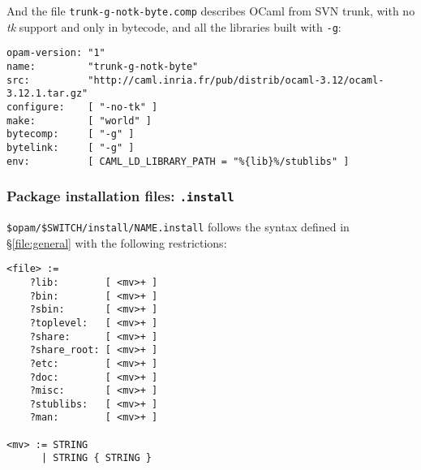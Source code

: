 \documentclass[a4paper,10pt]{article}
\begin{document}
And the file {\tt trunk-g-notk-byte.comp} describes OCaml from SVN
trunk, with no {\em tk} support and only in bytecode, and all the
libraries built with {\tt -g}:

\begin{verbatim}
opam-version: "1"
name:         "trunk-g-notk-byte"
src:          "http://caml.inria.fr/pub/distrib/ocaml-3.12/ocaml-3.12.1.tar.gz"
configure:    [ "-no-tk" ]
make:         [ "world" ]
bytecomp:     [ "-g" ]
bytelink:     [ "-g" ]
env:          [ CAML_LD_LIBRARY_PATH = "%{lib}%/stublibs" ]
\end{verbatim}


\subsubsection{Package installation files: {\tt *.install}}
\label{file:install}

\verb+$opam/$SWITCH/install/NAME.install+ follows the syntax defined
in \S\ref{file:general} with the following restrictions:

{\small
\begin{Verbatim}[frame=single]
<file> :=
    ?lib:        [ <mv>+ ]
    ?bin:        [ <mv>+ ]
    ?sbin:       [ <mv>+ ]
    ?toplevel:   [ <mv>+ ]
    ?share:      [ <mv>+ ]
    ?share_root: [ <mv>+ ]
    ?etc:        [ <mv>+ ]
    ?doc:        [ <mv>+ ]
    ?misc:       [ <mv>+ ]
    ?stublibs:   [ <mv>+ ]
    ?man:        [ <mv>+ ]

<mv> := STRING
      | STRING { STRING }
\end{Verbatim}
}
\end{document}
